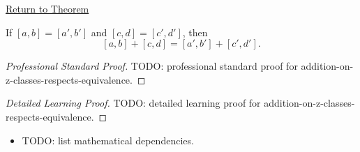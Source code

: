 \newpage
{}
\label{prf:addition-on-z-classes-respects-equivalence}

\begin{remark*}[Return]
\hyperref[lem:addition-on-z-classes-respects-equivalence]{Return to Theorem}
\end{remark*}

\begin{lemma*}
If $[a,b]=[a',b']$ and $[c,d]=[c',d']$, then
\[
[a,b]+[c,d]=[a',b']+[c',d'].
\]
\end{lemma*}

\begin{proof}[Professional Standard Proof]
\LRAProofBodyStart
TODO: professional standard proof for addition-on-z-classes-respects-equivalence.
\end{proof}

\begin{proof}[Detailed Learning Proof]
\LRAProofBodyStart
TODO: detailed learning proof for addition-on-z-classes-respects-equivalence.
\end{proof}

\begin{remark*}
\end{remark*}

\begin{dependencies}
\begin{itemize}
  \item TODO: list mathematical dependencies.
\end{itemize}
\end{dependencies}

\clearpage
